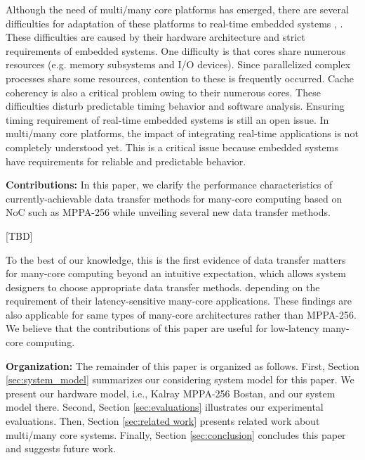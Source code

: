 \documentclass{sig-alternate-05-2015}
\begin{document}
Although the need of multi/many core platforms has emerged, there are several difficulties for adaptation of these platforms to real-time embedded systems \cite{becker2016contention}, \cite{saidi2015shift}.
These difficulties are caused by their hardware architecture and strict requirements of embedded systems.
One difficulty is that cores share numerous resources (e.g. memory subsystems and I/O devices).
Since parallelized complex processes share some resources, contention to these is frequently occurred.
Cache coherency is also a critical problem owing to their numerous cores.
These difficulties disturb predictable timing behavior and software analysis.
Ensuring timing requirement of real-time embedded systems is still an open issue.
In multi/many core platforms, the impact of integrating real-time applications is not completely understood yet.
This is a critical issue because embedded systems have requirements for reliable and predictable behavior.

\textbf{Contributions:}
In this paper, we clarify the performance characteristics of currently-achievable data transfer methods for many-core computing based on NoC such as MPPA-256
while unveiling several new data transfer methods. %

[TBD]

To the best of our knowledge, this is the first evidence of data transfer matters for many-core computing beyond an intuitive expectation,
which allows system designers to choose appropriate data transfer methods. %
depending on the requirement of their latency-sensitive many-core applications.
These findings are also applicable for same types of many-core architectures rather than MPPA-256.
We believe that the contributions of this paper are useful for low-latency many-core computing.

\textbf{Organization:}
The remainder of this paper is organized as follows.
First, Section \ref{sec:system_model} summarizes our considering system model for this paper.
We present our hardware model, i.e., Kalray MPPA-256 Bostan, and our system model there.
Second, Section \ref{sec:evaluations} illustrates our experimental evaluations.
Then, Section \ref{sec:related work} presents related work about multi/many core systems.
Finally, Section \ref{sec:conclusion} concludes this paper and suggests future work.
\end{document}

